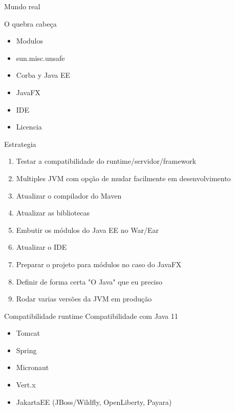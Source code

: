 \documentclass[aspectratio=169]{beamer}
\begin{document}
\begin{frame}[fragile]{Mundo real}\scriptsize

    O quebra cabeça
    \begin{itemize}
        \item Modulos
        \item sun.misc.unsafe
        \item Corba y Java EE
        \item JavaFX
        \item IDE
        \item Licencia
    \end{itemize}
    
    Estrategia
    \begin{enumerate}
        \item Testar a compatibilidade do runtime/servidor/framework
        \item Multiples JVM com opção de mudar facilmente em desenvolvimento
        \item Atualizar o compilador do Maven
        \item Atualizar as bibliotecas
        \item Embutir os módulos do Java EE no War/Ear
        \item Atualizar o IDE
        \item Preparar o projeto para módulos no caso do JavaFX
        \item Definir de forma certa "O Java" que eu preciso
        \item Rodar varias versões da JVM em produção
    \end{enumerate}
\end{frame}

\begin{frame}[fragile]{Compatibilidade runtime}
    Compatibilidade com Java 11
    \begin{itemize}
        \item Tomcat
        \item Spring
        \item Micronaut
        \item Vert.x
        \item JakartaEE (JBoss/Wildfly, OpenLiberty, Payara)
    \end{itemize}
\end{frame}
\end{document}
